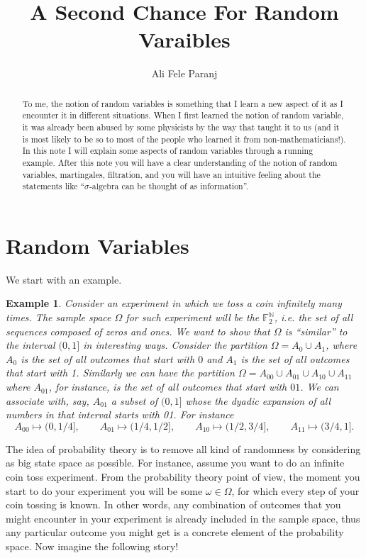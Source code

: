 \documentclass[11pt,a4paper]{article}
\title{A Second Chance For Random Varaibles}
\author{Ali Fele Paranj}
\theoremstyle{Example}
\newtheorem{example}{Example}
\newcommand{\N}{\mathbb{N}}
\begin{document}
	\maketitle
	\begin{abstract}
		To me, the notion of random variables is something that I learn a new aspect of it as I encounter it in different situations. When I first learned the notion of random variable, it was already been abused by some physicists by the way that taught it to us (and it is most likely to be so to most of the people who learned it from non-mathematicians!). In this note I will explain some aspects of random variables through a running example. After this note you will have a clear understanding of the notion of random variables, martingales, filtration, and you will have an intuitive feeling about the statements like ``$\sigma\text{-algebra}$ can be thought of as information''.
	\end{abstract}
	
	
	
	\section*{Random Variables}
	We start with an example.
	
	\begin{example}
		Consider an experiment in which we toss a coin infinitely many times. The sample space $ \Omega $ for such experiment will be the $ \mathbb{F}_2^\N $, i.e. the set of all sequences composed of zeros and ones. We want to show that $ \Omega $ is ``similar'' to the interval $ (0,1] $ in interesting ways. Consider the partition $ \Omega = A_0 \cup A_1 $, where $ A_0 $ is the set of all outcomes that start with $ 0 $ and $ A_1 $ is the set of all outcomes that start with 1. Similarly we can have the partition $ \Omega = A_{00} \cup A_{01} \cup A_{10} \cup A_{11} $ where $ A_{01} $, for instance, is the set of all outcomes that start with $ 01 $. We can associate with, say, $ A_{01} $ a subset of $ (0,1] $ whose the dyadic expansion of all numbers in that interval starts with 01. For instance
		\[ A_{00} \mapsto (0,1/4], \qquad A_{01} \mapsto (1/4,1/2], \qquad A_{10} \mapsto (1/2,3/4], \qquad A_{11} \mapsto (3/4,1]. \]
	\end{example}
 	
 	The idea of probability theory is to remove all kind of randomness by considering as big state space as possible. For instance, assume you want to do an infinite coin toss experiment. From the probability theory point of view, the moment you start to do your experiment you will be some $ \omega \in \Omega $, for which every step of your coin tossing is known. In other words, any combination of outcomes that you might encounter in your experiment is already included in the sample space, thus any particular outcome you might get is a concrete element of the probability space. Now imagine the following story!
 	
\end{document}
